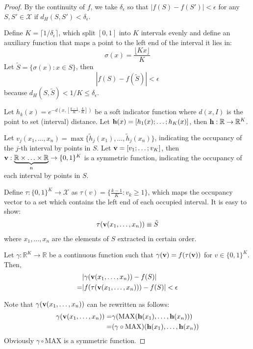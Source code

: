\begin{proof}
By the continuity of $f$, we take $\delta_{\epsilon}$ so that 
$|f(S)-f(S')|<\epsilon$ for any $S, S'\in \mathcal{X} \mbox{ if } d_H(S, S')<\delta_{\epsilon}$. 

Define $K=\lceil 1/\delta_{\epsilon}\rceil$, which split $[0,1]$ into $K$ intervals evenly and define an auxiliary function that maps a point to the left end of the interval it lies in:
$$\sigma(x)=\frac{\lfloor K x \rfloor}{K}$$
Let $\tilde{S}=\{\sigma(x):x\in S\}$, then
$$|f(S)-f(\tilde{S})|< \epsilon$$
because $d_H(S, \tilde{S})<1/K\le \delta_{\epsilon}$.

Let $h_k(x)=e^{-d(x, [\frac{k-1}{K}, \frac{k}{K}])}$ be a soft indicator function where $d(x, I)$ is the point to set (interval) distance. Let $\mathbf h(x)=[h_1(x); \ldots; h_K(x)]$, then $\mathbf h:\mathbb{R}\rightarrow \mathbb{R}^K$. 

Let $v_j(x_1, \ldots, x_n)=\max\{\tilde{h}_j(x_1),\ldots,\tilde{h}_j(x_n)\}$, indicating the occupancy of the $j$-th interval by points in $S$. Let $\mathbf v=[v_1;\ldots; v_K]$, then $\mathbf v:\underbrace{\mathbb{R}\times \ldots\times \mathbb{R}}_{n}\rightarrow \{0, 1\}^K$ is a symmetric function, indicating the occupancy of each interval by points in $S$. 

Define $\tau:\{0, 1\}^K\rightarrow \mathcal{X}$ as $\tau(v)=\{\frac{k-1}{K}: v_k\ge 1\}$, which maps the occupancy vector to a set which contains the left end of each occupied interval. It is easy to show:
\begin{align*}
\tau(\mathbf v(x_1, \ldots, x_n))\equiv \tilde{S} 
\end{align*}
where $x_1,\ldots,x_n$ are the elements of $S$ extracted in certain order.

Let $\gamma:\mathbb{R}^K\rightarrow \mathbb{R}$ be a continuous function such that $\gamma(\mathbf v)=f(\tau(\mathbf v))$ for $v\in\{0, 1\}^K$. Then,
\begin{align*}
&|\gamma(\mathbf v(x_1, \ldots, x_n))-f(S)|\\
=&|f(\tau(\mathbf v(x_1, \ldots, x_n)))-f(S)|<\epsilon
\end{align*}

Note that $\gamma(\mathbf v(x_1, \ldots, x_n))$ can be rewritten as follows:
\begin{align*}
\gamma(\mathbf v(x_1, \ldots, x_n))=&\gamma(\mbox{MAX}(\mathbf h(x_1), \ldots, \mathbf h(x_n)))\\
=&(\gamma \circ \mbox{MAX}) (\mathbf h(x_1),\ldots,\mathbf h(x_n))
\end{align*}
Obviously $\gamma \circ \mbox{MAX}$ is a symmetric function.
\end{proof}

